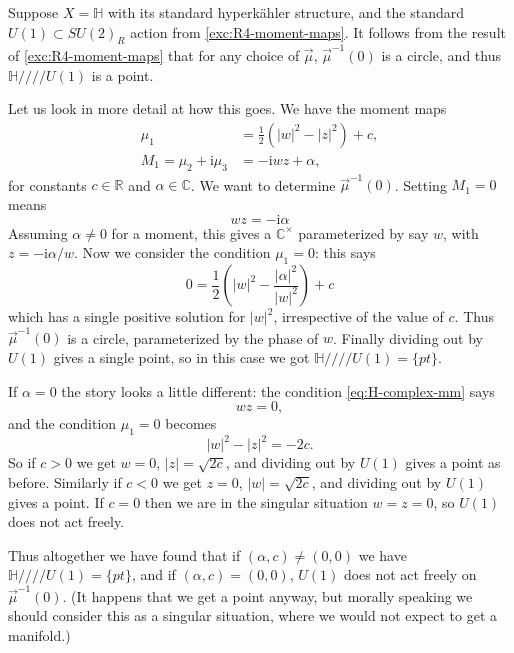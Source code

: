 \documentclass[12pt,letterpaper,reqno]{article}
\numberwithin{equation}{section}
\newcommand{\R}{\ensuremath{\mathbb R}}
\newcommand{\C}{\ensuremath{\mathbb C}}
\newcommand{\bbH}{\ensuremath{\mathbb H}}
\newcommand{\half}{\ensuremath{\frac{1}{2}}}
\newcommand{\hk}{hyperk\"ahler\xspace}
\newcommand{\hkq}{/\!\!/\!\!/\!\!/}
\newcommand{\I}{{\mathrm i}}
\newcommand{\abs}[1]{\lvert#1\rvert}
\begin{document}
\begin{example}[Hyperkahler quotient of $\bbH$ by $U(1)$] \label{exa:hk-quotients-of-H}
Suppose $X = \bbH$ with its standard \hk structure, and the standard
$U(1) \subset SU(2)_R$ action from \autoref{exc:R4-moment-maps}.
It follows from the result of \autoref{exc:R4-moment-maps}
that for any choice of $\vec\mu$, $\vec\mu^{-1}(0)$ is a circle,
and thus $\bbH \hkq U(1)$ is a point.

Let us look in more detail at how this goes.
We have the moment maps
\begin{align}
  \mu_{1} &= \half (\abs{w}^2 - \abs{z}^2) + c, \\
  M_1 = \mu_{2} + \I \mu_{3} &= -\I w z + \alpha,
\end{align}
for constants $c \in \R$ and $\alpha \in \C$.
We want to determine $\vec\mu^{-1}(0)$. Setting $M_1 = 0$
means
\begin{equation} \label{eq:H-complex-mm}
 wz = - \I \alpha
\end{equation}
Assuming $\alpha \neq 0$ for a moment,
this gives a $\C^\times$ parameterized by say $w$,
with $z = - \I \alpha / w$. Now we consider the condition
$\mu_1 = 0$: this says
\begin{equation} \label{eq:H-real-mm}
  0 = \half\left(\abs{w}^2 - \frac{\abs{\alpha}^2}{\abs{w}^2}\right) + c
\end{equation}
which has a single positive solution for $\abs{w}^2$, irrespective of
the value of $c$. Thus $\vec\mu^{-1}(0)$ is a circle, parameterized
by the phase of $w$. Finally dividing out by $U(1)$ gives a single point,
so in this case we got $\bbH \hkq U(1) = \{ pt \}$.

If $\alpha = 0$ the story looks a little different: the condition
\eqref{eq:H-complex-mm} says
\begin{equation}
wz = 0,
\end{equation}
and the condition $\mu_1 = 0$ becomes
\begin{equation}
  \abs{w}^2 - \abs{z}^2 = - 2c.
\end{equation}
So if $c > 0$ we get $w = 0$, $\abs{z} = \sqrt{2c}$, and dividing out by $U(1)$
gives a point as before. Similarly if $c < 0$ we get $z = 0$, $\abs{w} = \sqrt{2c}$,
and dividing out by $U(1)$
gives a point. If $c = 0$ then we are in the singular situation $w = z = 0$,
so $U(1)$ does not act freely.

Thus altogether we have found that if $(\alpha,c) \neq (0,0)$ we have
$\bbH \hkq U(1) = \{ pt \}$, and if $(\alpha,c) = (0,0)$, $U(1)$ does not
act freely on $\vec\mu^{-1}(0)$. (It happens that we get a point anyway,
but morally speaking we should consider this as a singular situation, where
we would not expect to get a manifold.)


\end{example}
\end{document}
